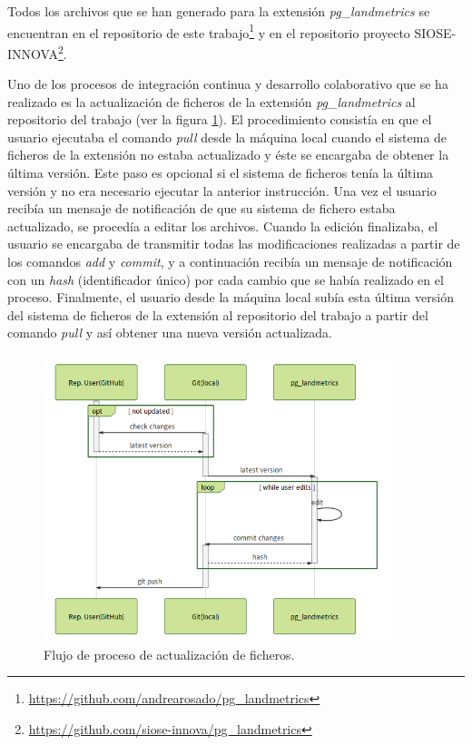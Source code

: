Todos los archivos que se han generado para la extensión \textit{pg\_landmetrics} se encuentran en el repositorio de este trabajo\footnote{\url{https://github.com/andrearosado/pg_landmetrics}} y en el repositorio proyecto SIOSE-INNOVA\footnote{\url{https://github.com/siose-innova/pg_landmetrics}}.

Uno de los procesos de integración continua y desarrollo colaborativo que se ha realizado es la actualización de ficheros de la extensión \textit{pg\_landmetrics} al repositorio del trabajo (ver la figura \ref{fig:diary}). El procedimiento consistía en que el usuario ejecutaba el comando \textit{pull} desde la máquina local cuando el sistema de ficheros de la extensión no estaba actualizado y éste se encargaba de obtener la última versión. Este paso es opcional si el sistema de ficheros tenía la última versión y no era necesario ejecutar la anterior instrucción. Una vez el usuario recibía un mensaje de notificación de que su sistema de fichero estaba actualizado, se procedía a editar los archivos. Cuando la edición finalizaba, el usuario se encargaba de transmitir todas las modificaciones realizadas a partir de los comandos \textit{add} y \textit{commit}, y a continuación recibía un mensaje de notificación con un \textit{hash} (identificador único) por cada cambio que se había realizado en el proceso. Finalmente, el usuario desde la máquina local subía esta última versión del sistema de ficheros de la extensión al repositorio del trabajo a partir del comando \textit{pull} y así obtener una nueva versión actualizada.

\begin{figure}
\begin{center}
\includegraphics[width=0.9\textwidth]{Metodologia/Figs/diary.png}
\caption{Flujo de proceso de actualización de ficheros. \label{fig:diary}}
\end{center}
\end{figure}

